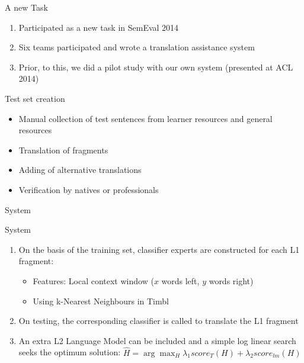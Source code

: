 \documentclass[compress]{beamer}
\begin{document}
\begin{frame}
  \begin{block}{A new Task}

    \begin{enumerate}
      \item Participated as a new task in SemEval 2014
      \item Six teams participated and wrote a translation assistance system
      \item Prior, to this, we did a pilot study with our own system (presented at ACL 2014)
    \end{enumerate}
  \end{block}

  \begin{block}{Test set creation}
    \begin{itemize}
      \item Manual collection of test sentences from learner resources and
        general resources
      \item Translation of fragments
      \item Adding of alternative translations
      \item Verification by natives or professionals
    \end{itemize}
  \end{block}
\end{frame}


\begin{frame}{System}

\begin{block}{System}
  \begin{enumerate}
    \item On the basis of the training set, classifier experts are constructed
    for each L1 fragment:
    \begin{itemize}
      \item<2-> Features: Local context window ($x$ words left, $y$ words right)
      \item<2-> Using k-Nearest Neighbours in Timbl
    \end{itemize}
    \item<3-> On testing, the corresponding classifier is called to translate the L1
    fragment
    \item<4-> An extra L2 Language Model can be included and a simple log
      linear search seeks the optimum solution: 
      $\hat{H} = \arg\max_H \lambda_1 score_T(H) + \lambda_2 score_{lm}(H)$
  \end{enumerate}
\end{block}

\end{frame}
\end{document}
